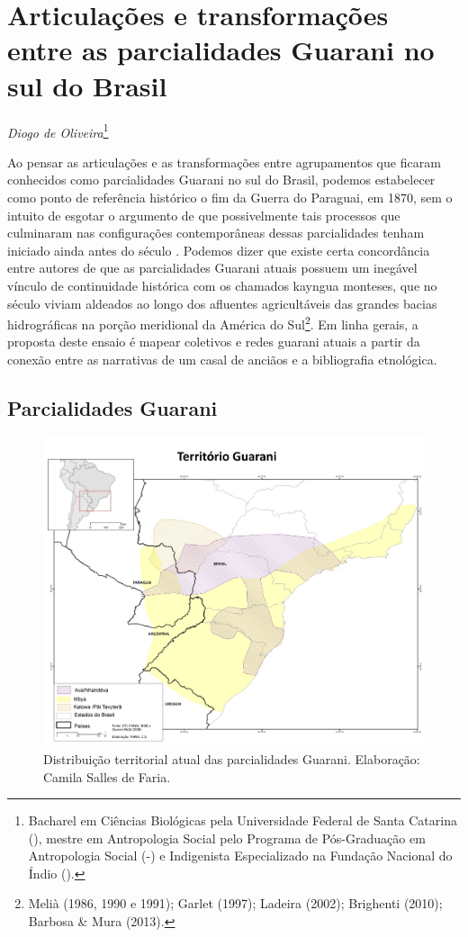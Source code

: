 {{\chapter{Articulações e transformações entre as parcialidades Guarani no sul do
Brasil}
\begin{flushright}
\emph{Diogo de Oliveira}\footnote{Bacharel em Ciências Biológicas pela Universidade Federal de Santa Catarina (),
mestre em Antropologia Social pelo Programa de Pós-Graduação em Antropologia Social (-) e Indigenista
Especializado na Fundação Nacional do Índio ().}
\end{flushright}

Ao pensar as articulações e as transformações entre agrupamentos que
ficaram conhecidos como parcialidades Guarani no sul do Brasil, podemos
estabelecer como ponto de referência histórico o fim da Guerra do
Paraguai, em 1870, sem o intuito de esgotar o argumento de que
possivelmente tais processos que culminaram nas configurações
contemporâneas dessas parcialidades tenham iniciado ainda antes do
século . Podemos dizer que existe certa concordância entre autores
de que as parcialidades Guarani atuais possuem um inegável vínculo de
continuidade histórica com os chamados kayngua monteses, que no século
 viviam aldeados ao longo dos afluentes agricultáveis das grandes
bacias hidrográficas na porção meridional da América do
Sul\footnote{Melià (1986, 1990 e 1991); Garlet (1997); Ladeira (2002);
Brighenti (2010); Barbosa \& Mura (2013).}. Em linha gerais, a proposta
deste ensaio é mapear coletivos e redes guarani atuais a partir da
conexão entre as narrativas de um casal de anciãos e a bibliografia
etnológica. 

\section{Parcialidades Guarani}

\begin{figure}
  \centering
 \includegraphics[width=\textwidth]{./img/GUARANIS-img7.jpg}	
  \hfill
  \caption{Distribuição territorial atual das parcialidades Guarani. Elaboração: Camila Salles de Faria.}
\end{figure}

}}

